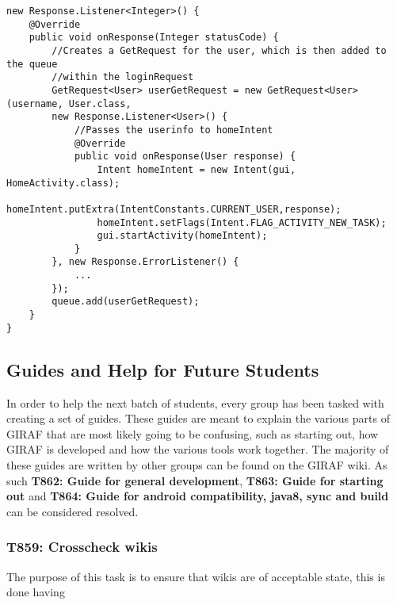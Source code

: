 \begin{minipage}[H]{\linewidth}
\begin{lstlisting}[caption = If the user information is authenticated we proceed
with a request for user, label = userReq] new Response.Listener<Integer>() {
	@Override
    public void onResponse(Integer statusCode) {
    	//Creates a GetRequest for the user, which is then added to the queue
    	//within the loginRequest 
    	GetRequest<User> userGetRequest = new GetRequest<User>(username, User.class, 
    	new Response.Listener<User>() {
        	//Passes the userinfo to homeIntent
            @Override
            public void onResponse(User response) {
            	Intent homeIntent = new Intent(gui, HomeActivity.class);
                homeIntent.putExtra(IntentConstants.CURRENT_USER,response);
                homeIntent.setFlags(Intent.FLAG_ACTIVITY_NEW_TASK);
                gui.startActivity(homeIntent);
            }
        }, new Response.ErrorListener() {
			...
        });
        queue.add(userGetRequest);
	}
}
\end{lstlisting}
\end{minipage}



\subsection{Guides and Help for Future Students}
In order to help the next batch of students, every group has been tasked with
creating a set of guides. These guides are meant to explain the various
parts of GIRAF that are most likely going to be confusing, such as starting out,
how GIRAF is developed and how the various tools work together. The
majority of these guides are written by other groups can be found on the GIRAF
wiki\citep{GWiki}. As such \textbf{T862: Guide for general development},
\textbf{T863: Guide for starting out} and \textbf{T864: Guide for android
compatibility, java8, sync and build} can be considered resolved.

\subsubsection{T859: Crosscheck wikis}
The purpose of this task is to ensure that wikis are of acceptable state, this
is done having

